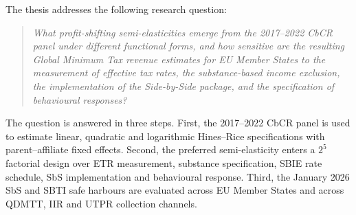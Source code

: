 \documentclass[11pt,a4paper]{article}
\begin{document}
The thesis addresses the following research question:

\begin{quote}
\textit{What profit-shifting semi-elasticities emerge from the 2017--2022 CbCR panel under different functional forms, and how sensitive are the resulting Global Minimum Tax revenue estimates for EU Member States to the measurement of effective tax rates, the substance-based income exclusion, the implementation of the Side-by-Side package, and the specification of behavioural responses?}
\end{quote}

The question is answered in three steps. First, the 2017--2022 CbCR panel is used to estimate linear, quadratic and logarithmic Hines--Rice specifications with parent--affiliate fixed effects. Second, the preferred semi-elasticity enters a $2^5$ factorial design over ETR measurement, substance specification, SBIE rate schedule, SbS implementation and behavioural response. Third, the January 2026 SbS and SBTI safe harbours are evaluated across EU Member States and across QDMTT, IIR and UTPR collection channels.
\end{document}
